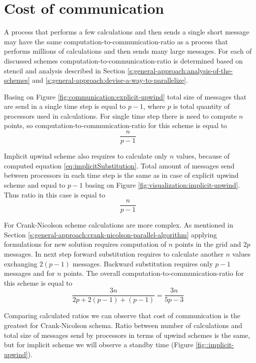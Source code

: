 \section{Cost of communication} \label{s:results:cost-of-communication}
	A process that performs a few calculations and then sends a single short message may have the same \gls{computation-to-communication-ratio} as a process that performs millions of calculations and then sends many large messages. For each of discussed schemes \gls{computation-to-communication-ratio} is determined based on \gls{stencil} and analysis described in Section \ref{s:general-approach:analysis-of-the-schemes} and \ref{s:general-approach:devise-a-way-to-parallelize}.
	
	Basing on Figure \ref{fig:communication:explicit-upwind} total size of messages that are send in a single time step is equal to $p-1$, where $p$ is total quantity of processors used in calculations. For single time step there is need to compute $n$ points, so \gls{computation-to-communication-ratio} for this scheme is equal to
	\begin{equation}
		\frac{n}{p-1}
	\end{equation}
		
	Implicit upwind scheme also requires to calculate only $n$ values, because of computed equation \eqref{eq:implicitSubstitution}. Total amount of messages send between processors in each time step is the same as in case of explicit upwind scheme and equal to $p-1$ basing on Figure \ref{fig:visualization:implicit-upwind}. Thus ratio in this case is equal to
	\begin{equation}
		\frac{n}{p-1}
	\end{equation}
	
	For Crank-Nicolson scheme calculations are more complex. As mentioned in Section \ref{s:general-approach:crank-nicolson-parallel-algorithm} applying formulations for new solution requires computation of $n$ points in the grid and $2p$ messages. In next step forward substitution requires to calculate another $n$ values exchanging $2(p-1)$ messages. Backward substitution requires only $p-1$ messages and for $n$ points. The overall \gls{computation-to-communication-ratio} for this scheme is equal to
	\begin{equation}
		\frac{3n}{2p + 2(p-1) + (p-1)} = \frac{3n}{5p-3}
	\end{equation}
	
	Comparing calculated ratios we can observe that cost of communication is the greatest for Crank-Nicolson schema. Ratio between number of calculations and total size of messages send by processors in terms of upwind schemes is the same, but for implicit scheme we will observe a standby time (Figure \ref{fig::implicit-upwind}).
